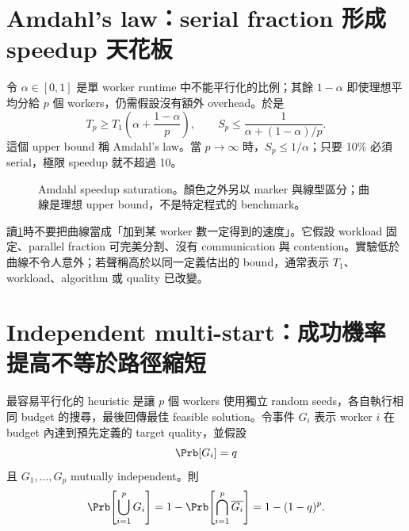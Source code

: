 \documentclass[11pt,a4paper,oneside,openany]{book}
\begin{document}
\section{Amdahl's law：serial fraction 形成 speedup 天花板}

令 $\alpha\in[0,1]$ 是單 worker runtime 中不能平行化的比例；其餘 $1-\alpha$ 即使理想平均分給 $p$ 個 workers，仍需假設沒有額外 overhead。於是
\[
 T_p\ge T_1\left(\alpha+\frac{1-\alpha}{p}\right),
\qquad
 S_p\le\frac{1}{\alpha+(1-\alpha)/p}.
\]
這個 upper bound 稱 Amdahl's law\cite{amdahl1967}。當 $p\to\infty$ 時，$S_p\le1/\alpha$；只要 10\% 必須 serial，極限 speedup 就不超過 10。

\begin{figure}[htbp]
\centering
{}
\caption{Amdahl speedup saturation。顏色之外另以 marker 與線型區分；曲線是理想 upper bound，不是特定程式的 benchmark。}
\label{fig:amdahl-curves}
\end{figure}

讀\cref{fig:amdahl-curves}時不要把曲線當成「加到某 worker 數一定得到的速度」。它假設 workload 固定、parallel fraction 可完美分割、沒有 communication 與 contention。實驗低於曲線不令人意外；若聲稱高於以同一定義估出的 bound，通常表示 $T_1$、workload、algorithm 或 quality 已改變。

\section{Independent multi-start：成功機率提高不等於路徑縮短}

最容易平行化的 heuristic 是讓 $p$ 個 workers 使用獨立 random seeds，各自執行相同 budget 的搜尋，最後回傳最佳 feasible solution。令事件 $G_i$ 表示 worker $i$ 在 budget 內達到預先定義的 target quality，並假設
\[
 \Prb[G_i]=q
\]
且 $G_1,\ldots,G_p$ mutually independent。則
\[
 \Prb\!\left[\bigcup_{i=1}^pG_i\right]
 =1-\Prb\!\left[\bigcap_{i=1}^p\overline{G_i}\right]
 =1-(1-q)^p.
\]
\end{document}
